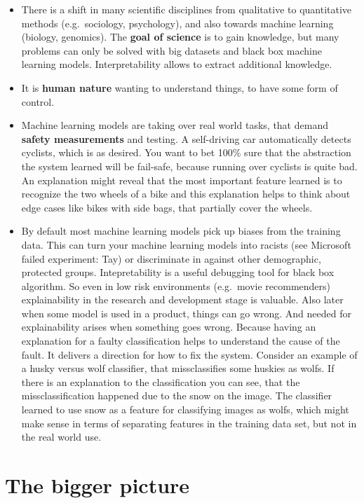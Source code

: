 \documentclass[12pt,]{krantz}
\providecommand{\tightlist}{%
  \setlength{\itemsep}{0pt}\setlength{\parskip}{0pt}}
\theoremstyle{definition}
\theoremstyle{definition}
\theoremstyle{definition}
\theoremstyle{remark}
\begin{document}
\begin{itemize}
\tightlist
\item
  There is a shift in many scientific disciplines from qualitative to
  quantitative methods (e.g.~sociology, psychology), and also towards
  machine learning (biology, genomics). The \textbf{goal of science} is
  to gain knowledge, but many problems can only be solved with big
  datasets and black box machine learning models. Interpretability
  allows to extract additional knowledge.
\item
  It is \textbf{human nature} wanting to understand things, to have some
  form of control.
\item
  Machine learning models are taking over real world tasks, that demand
  \textbf{safety measurements} and testing. A self-driving car
  automatically detects cyclists, which is as desired. You want to bet
  100\% sure that the abstraction the system learned will be fail-safe,
  because running over cyclists is quite bad. An explanation might
  reveal that the most important feature learned is to recognize the two
  wheels of a bike and this explanation helps to think about edge cases
  like bikes with side bags, that partially cover the wheels.
\item
  By default most machine learning models pick up biases from the
  training data. This can turn your machine learning models into racists
  (see Microsoft failed experiment: Tay) or discriminate in against
  other demographic, protected groups. Intepretability is a useful
  debugging tool for black box algorithm. So even in low risk
  environments (e.g.~movie recommenders) explainability in the research
  and development stage is valuable. Also later when some model is used
  in a product, things can go wrong. And needed for explainability
  arises when something goes wrong. Because having an explanation for a
  faulty classification helps to understand the cause of the fault. It
  delivers a direction for how to fix the system. Consider an example of
  a husky versus wolf classifier, that missclassifies some huskies as
  wolfs. If there is an explanation to the classification you can see,
  that the missclassification happened due to the snow on the image. The
  classifier learned to use snow as a feature for classifying images as
  wolfs, which might make sense in terms of separating features in the
  training data set, but not in the real world use. 
\end{itemize}

\section{The bigger picture}\label{the-bigger-picture}
\end{document}

